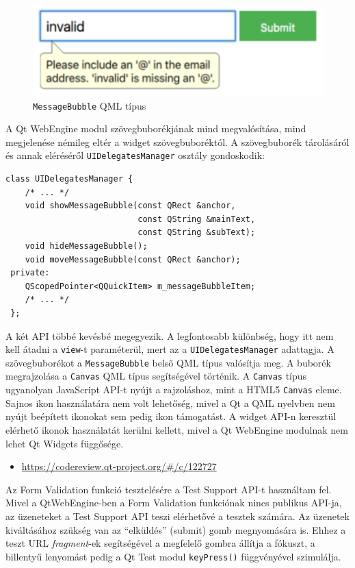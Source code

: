 \documentclass[12pt]{report}
\let\origurl\url
\renewcommand{\url}[1]{%
    \textcolor{blue}{\origurl{#1}}
}
\newcommand{\gerrit}[1]{%
    \textcolor{qtgreen}{\origurl{https://codereview.qt-project.org/\#/c/#1}}
}
\begin{document}
\begin{figure}[ht]
    \centering
    \includegraphics[scale=0.7]{bubi-quick-screenshot}
    \caption{
        \label{fig:bubi-quick-screenshot}
        \texttt{MessageBubble} QML típus
    }
\end{figure}

A Qt WebEngine modul szövegbuborékjának mind megvalósítása, mind megjelenése némileg eltér
a widget szövegbuboréktól. A szövegbuborék tárolásáról és annak eléréséről
\texttt{UIDelegatesManager} osztály gondoskodik:
\begin{lstlisting}[title=src/webengine/ui\_delegates\_manager.h]
 class UIDelegatesManager {
    /* ... */
    void showMessageBubble(const QRect &anchor,
                           const QString &mainText,
                           const QString &subText);
    void hideMessageBubble();
    void moveMessageBubble(const QRect &anchor);
 private:
    QScopedPointer<QQuickItem> m_messageBubbleItem;
    /* ... */
 };
\end{lstlisting}
A két API többé kevésbé megegyezik. A legfontosabb különbség, hogy itt nem kell átadni a
\texttt{view}-t paraméterül, mert az a \texttt{UIDelegatesManager} adattagja. A
szövegbuborékot a \texttt{MessageBubble} belső QML típus valósítja meg. A buborék
megrajzolása a \texttt{Canvas} QML típus segítségével történik. A \texttt{Canvas} típus
ugyanolyan JavaScript API-t nyújt a rajzoláshoz, mint a HTML5 \texttt{Canvas} eleme.
Sajnos ikon használatára nem volt lehetőség, mivel a Qt a QML nyelvben nem nyújt beépített
ikonokat sem pedig ikon támogatást. A widget API-n keresztül elérhető ikonok használatát
kerülni kellett, mivel a Qt WebEngine modulnak nem lehet Qt Widgets függősége.

\begin{center}
    \begin{reviewbox}
        \begin{itemize}
            \renewcommand{\labelitemi}{\textcolor{qtgreen}{$\blacktriangleright$}}
            \item \gerrit{122727}
        \end{itemize}
    \end{reviewbox}
\end{center}
Az Form Validation funkció tesztelésére a Test Support API-t használtam fel. Mivel a
QtWebEngine-ben a Form Validation funkciónak nincs publikus API-ja, az üzeneteket a Test
Support API teszi elérhetővé a tesztek számára. Az üzenetek kiváltásához szükség van
az ``elküldés'' (submit) gomb megnyomására is. Ehhez a teszt URL \textit{fragment}-ek
segítségével a megfelelő gombra állítja a fókuszt, a billentyű lenyomást pedig a Qt Test
modul \texttt{keyPress()} függvényével szimulálja.
\end{document}
